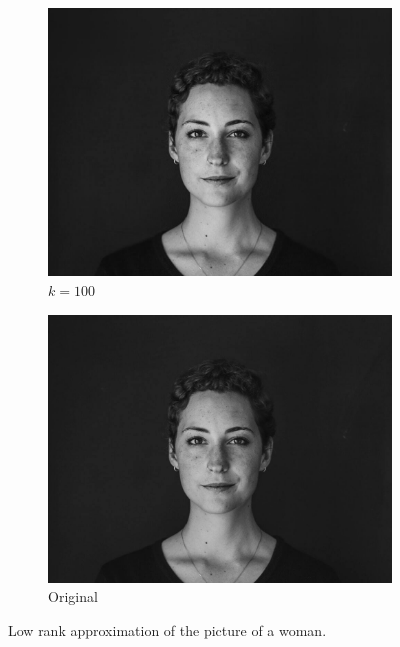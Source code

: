 \documentclass[11pt,a4paper]{article}
\begin{document}
\begin{figure}[H]
\begin{subfigure}[t]{.5\textwidth}
    \includegraphics[scale=0.15]{img/k100_woman}
    \caption{$k = 100$}
  \end{subfigure}%
  \begin{subfigure}[t]{.5\textwidth}
    \centering
    \includegraphics[scale=0.15]{img/woman}
    \caption{Original}
  \end{subfigure}%
  \caption{Low rank approximation of the picture of a woman.}
  \label{fig:woman-lr-approximation}
\end{figure}
\end{document}

